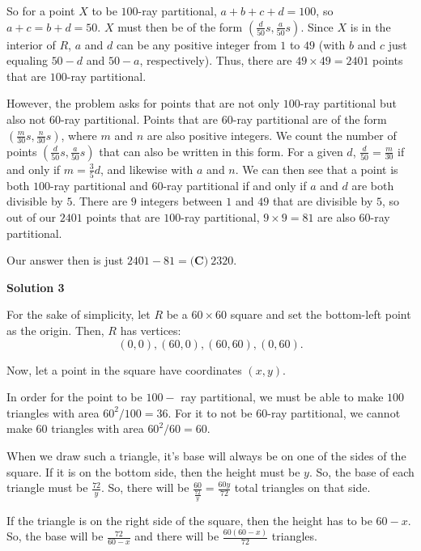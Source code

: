 \begin{enumerate}
 
So for a point $X$ to be $100$-ray partitional, $a+b+c+d=100$, so $a+c=b+d=50$. $X$ must then be of the form $\left(\frac{d}{50}s, \frac{a}{50}s\right)$. Since $X$ is in the interior of $R$, $a$ and $d$ can be any positive integer from $1$  to $49$ (with $b$ and $c$ just equaling $50-d$ and $50-a$, respectively). Thus, there are $49\times 49=2401$ points that are $100$-ray partitional.

 
However, the problem asks for points that are not only $100$-ray partitional but also not $60$-ray partitional. Points that are $60$-ray partitional are of the form $\left(\frac{m}{30}s, \frac{n}{30}s\right)$, where $m$ and $n$ are also positive integers. We count the number of points $\left(\frac{d}{50}s, \frac{a}{50}s\right)$ that can also be written in this form. For a given $d$, $\frac{d}{50}=\frac{m}{30}$ if and only if $m=\frac{3}{5}d$, and likewise with $a$ and $n$. We can then see that a point is both $100$-ray partitional and $60$-ray partitional if and only if $a$ and $d$ are both divisible by $5$. There are $9$ integers between $1$ and $49$ that are divisible by $5$, so out of our $2401$ points that are $100$-ray partitional, $9\times 9=81$ are also $60$-ray partitional.

 
Our answer then is just $2401-81=\boxed{\textbf{(C)}\ 2320}$.

 



\textbf{Solution 3}

For the sake of simplicity, let $R$ be a $60 \times 60$ square and set the bottom-left point as the origin. Then, $R$ has vertices: 
 \[(0,0), (60,0), (60,60), (0,60).\]

 Now, let a point in the square have coordinates $(x, y).$

 In order for the point to be $100-$ ray partitional, we must be able to make $100$ triangles with area $60^2/100 = 36.$ For it to not be $60$-ray partitional, we cannot make $60$ triangles with area $60^2/60 = 60.$

 When we draw such a triangle, it's base will always be on one of the sides of the square. If it is on the bottom side, then the height must be $y$. So, the base of each triangle must be $\frac{72}{y}.$ So, there will be $\frac{60}{\frac{72}{y}} = \frac{60y}{72}$ total triangles on that side.

 If the triangle is on the right side of the square, then the height has to be $60 - x.$ So, the base will be $\frac{72}{60-x}$ and there will be $\frac{60 (60-x)}{72}$ triangles.


\end{enumerate}
